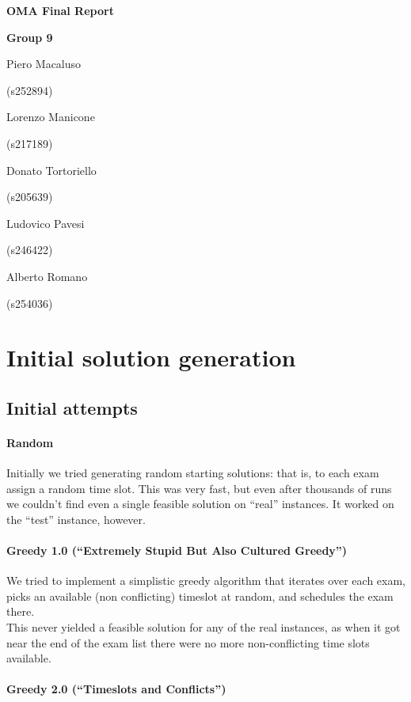 \documentclass[11pt, a4paper, leqno]{article}
\newcommand{\nome}[2]{
	\begin{minipage}[t]{0.185\linewidth}
		\centering #1\par
		\centering\small (#2)\par
	\end{minipage}
}
\begin{document}
	
	\begin{center}
		{\huge\textbf{OMA Final Report}}\par
		\vspace{0.3em}
		{\large\textbf{Group 9}}\par
		\vspace{1em}
		\nome{Piero Macaluso}{s252894}
		\nome{Lorenzo Manicone}{s217189}
		\nome{Donato Tortoriello}{s205639}
		\nome{Ludovico Pavesi}{s246422}
		\nome{Alberto Romano}{s254036} %
	\end{center}
	
	\section{Initial solution generation}
	
	\subsection{Initial attempts}
	
	\paragraph{Random}
	
	Initially we tried generating random starting solutions: that is, to each exam assign a random time slot. This was very fast, but even after thousands of runs we couldn't find even a single feasible solution on ``real'' instances. It worked on the ``test'' instance, however.
	
	\paragraph{Greedy 1.0 (``Extremely Stupid But Also Cultured Greedy'')}
	
	We tried to implement a simplistic greedy algorithm that iterates over each exam, picks an available (non conflicting) timeslot at random, and schedules the exam there.\\
	This never yielded a feasible solution for any of the real instances, as when it got near the end of the exam list there were no more non-conflicting time slots available.
	
	\paragraph{Greedy 2.0 (``Timeslots and Conflicts'')}
	
\end{document}

